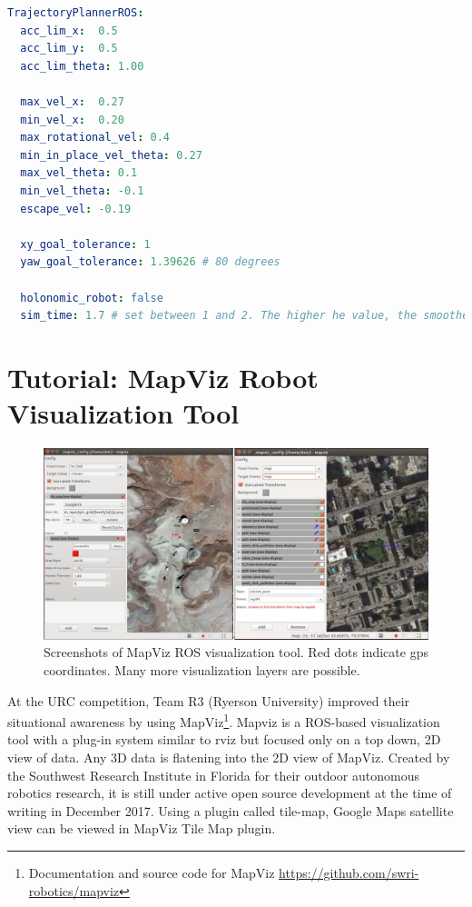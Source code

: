\documentclass[runningheads,a4paper]{llncs}
\begin{document}
\begin{lstlisting}[language=yaml,frame=single,basicstyle=\ttfamily\footnotesize,breaklines=true,captionpos=b,caption={Important velocity settings in the base\_local\_planner\_params.yaml configuration file of move\_base.}]
TrajectoryPlannerROS:
  acc_lim_x:  0.5
  acc_lim_y:  0.5
  acc_lim_theta: 1.00

  max_vel_x:  0.27
  min_vel_x:  0.20
  max_rotational_vel: 0.4
  min_in_place_vel_theta: 0.27
  max_vel_theta: 0.1
  min_vel_theta: -0.1
  escape_vel: -0.19

  xy_goal_tolerance: 1
  yaw_goal_tolerance: 1.39626 # 80 degrees

  holonomic_robot: false
  sim_time: 1.7 # set between 1 and 2. The higher he value, the smoother the path (though more samples would be required)
\end{lstlisting}

\section{Tutorial: MapViz Robot Visualization Tool}\label{mapviz}

\begin{figure}
\centering
\includegraphics[width=\textwidth]{mapviz}
\caption{Screenshots of MapViz ROS visualization tool. Red dots indicate gps coordinates. Many more visualization layers are possible.}
\label{fig:mapviz}
\end{figure}


At the URC competition, Team R3 (Ryerson University) improved their situational awareness by using MapViz\footnote{Documentation and source code for MapViz \url{https://github.com/swri-robotics/mapviz}}. Mapviz is a ROS-based visualization tool with a plug-in system similar to rviz but focused only on a top down, 2D view of data. Any 3D data is flatening into the 2D view of MapViz. Created by the Southwest Research Institute in Florida for their outdoor autonomous robotics research, it is still under active open source development at the time of writing in December 2017. Using a plugin called tile-map, Google Maps satellite view can be viewed in MapViz Tile Map plugin.
\end{document}

